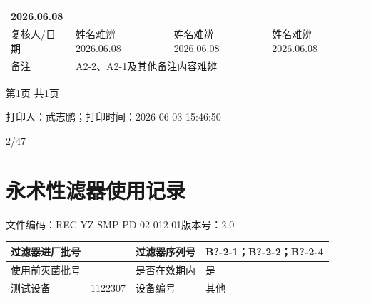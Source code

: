 \documentclass[UTF8,10pt,a4paper,fontset=fandol]{ctexart}
\newcommand{\fieldvalue}[1]{#1}
\newcommand{\handwritten}[1]{#1}
\begin{document}
\begin{tabularx}{\textwidth}{|p{}|X|p{}|X|}
\fieldvalue{\handwritten{2026.06.08}}
\\ \hline
复核人/日期 &
\multicolumn{1}{X|}{
\fieldvalue{\handwritten{姓名难辨}}\quad
\fieldvalue{\handwritten{2026.06.08}}} &
\multicolumn{1}{X|}{
\fieldvalue{\handwritten{姓名难辨}}\quad
\fieldvalue{\handwritten{2026.06.08}}} &
\fieldvalue{\handwritten{姓名难辨}}\quad
\fieldvalue{\handwritten{2026.06.08}}
\\ \hline
备注 &
\multicolumn{3}{X|}{
\fieldvalue{\handwritten{A2-2、A2-1及其他备注内容难辨}}
}\\ \hline
\end{tabularx}

\begin{center}
第1页 共1页
\end{center}

打印人：武志鹏；打印时间：2026-06-03 15:46:50

\handwritten{2/47}

\newpage

\section*{永术性滤器使用记录}

\noindent
文件编码：REC-YZ-SMP-PD-02-012-01\qquad 版本号：2.0

\begin{tabularx}{\textwidth}{|p{2.5cm}|X|p{2.5cm}|X|}
\hline
过滤器进厂批号 & & 过滤器序列号 &
\fieldvalue{\handwritten{B?-2-1；B?-2-2；B?-2-4}}\\
\hline
使用前灭菌批号 & & 是否在效期内 &
\fieldvalue{是}\\
\hline
测试设备 &
\fieldvalue{1122307} &
设备编号 &
\fieldvalue{其他}\\
\hline
\end{tabularx}
\end{document}
